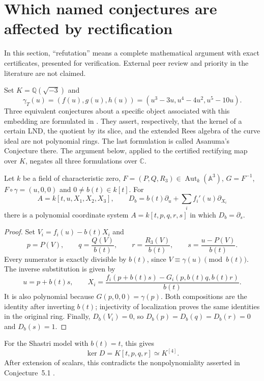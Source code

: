 \section{Which named conjectures are affected by rectification}

In this section, ``refutation'' means a complete mathematical argument
with exact certificates, presented for verification. External peer review
and priority in the literature are not claimed.

Set $K=\mathbb Q(\sqrt{-3})$ and
\[
\gamma_T(u)=(f(u),g(u),h(u))
=(u^3-3u,u^4-4u^2,u^5-10u).
\]
Three equivalent conjectures about a specific object associated with this
embedding are formulated in \cite[pp.~1319--1320]{vdER}.
They assert, respectively, that the kernel of a certain LND, the quotient
by its slice, and the extended Rees algebra of the curve ideal are not
polynomial rings. The last formulation is called Asanuma's Conjecture there.
The argument below, applied to the certified rectifying map over $K$,
negates all three formulations over $\mathbb C$.

\begin{proposition}
Let $k$ be a field of characteristic zero,
$F=(P,Q,R_3)\in\operatorname{Aut}_k(\mathbb A^3)$,
$G=F^{-1}$, $F\circ\gamma=(u,0,0)$ and $0\ne b(t)\in k[t]$.
For
\[
A=k[t,u,X_1,X_2,X_3],\qquad
D_b=b(t)\partial_u+\sum_i f_i'(u)\partial_{X_i}
\]
there is a polynomial coordinate system
$A=k[t,p,q,r,s]$ in which $D_b=\partial_s$.
\end{proposition}

\begin{proof}
Set $V_i=f_i(u)-b(t)X_i$ and
\[
p=P(V),\qquad q=\frac{Q(V)}{b(t)},\qquad
r=\frac{R_3(V)}{b(t)},\qquad
s=\frac{u-P(V)}{b(t)}.
\]
Every numerator is exactly divisible by $b(t)$, since
$V\equiv\gamma(u)\pmod{b(t)}$. The inverse substitution is given by
\[
u=p+b(t)s,\qquad
X_i=\frac{f_i(p+b(t)s)-G_i(p,b(t)q,b(t)r)}{b(t)}.
\]
It is also polynomial because $G(p,0,0)=\gamma(p)$.
Both compositions are the identity after inverting $b(t)$; injectivity
of localization proves the same identities in the original ring. Finally,
$D_b(V_i)=0$, so $D_b(p)=D_b(q)=D_b(r)=0$ and $D_b(s)=1$.
\end{proof}

For the Shastri model with $b(t)=t$, this gives
\[
\ker D=K[t,p,q,r]\simeq K^{[4]}.
\]
After extension of scalars, this contradicts the nonpolynomiality
asserted in Conjecture~5.1 \cite{vdER}.

